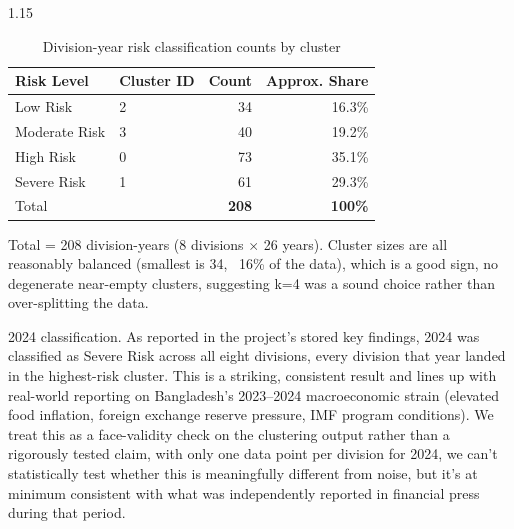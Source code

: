 \documentclass[12pt,a4paper]{article}
\begin{document}
\begin{table}[H]
\centering
\begin{spacing}{1.15}
\caption{Division-year risk classification counts by cluster}
\label{tab:riskdist}
\begin{tabular}{llrr}
\toprule
\textbf{Risk Level} & \textbf{Cluster ID} & \textbf{Count} & \textbf{Approx. Share} \\
\midrule
Low Risk      & 2 &  34 & 16.3\% \\
Moderate Risk & 3 &  40 & 19.2\% \\
High Risk     & 0 &  73 & 35.1\% \\
Severe Risk   & 1 &  61 & 29.3\% \\
Total         &   & \textbf{208} & \textbf{100\%} \\
\bottomrule
\end{tabular}
\end{spacing}
\end{table}
Total = 208 division-years (8 divisions $\times$ 26 years). Cluster sizes are all reasonably balanced (smallest is 34, ~16\% of the data), which is a good sign, no degenerate near-empty clusters, suggesting k=4 was a sound choice rather than over-splitting the data.

2024 classification. As reported in the project's stored key findings, 2024 was classified as Severe Risk across all eight divisions, every division that year landed in the highest-risk cluster. This is a striking, consistent result and lines up with real-world reporting on Bangladesh's 2023--2024 macroeconomic strain (elevated food inflation, foreign exchange reserve pressure, IMF program conditions). We treat this as a face-validity check on the clustering output rather than a rigorously tested claim, with only one data point per division for 2024, we can't statistically test whether this is meaningfully different from noise, but it's at minimum consistent with what was independently reported in financial press during that period.
\end{document}
